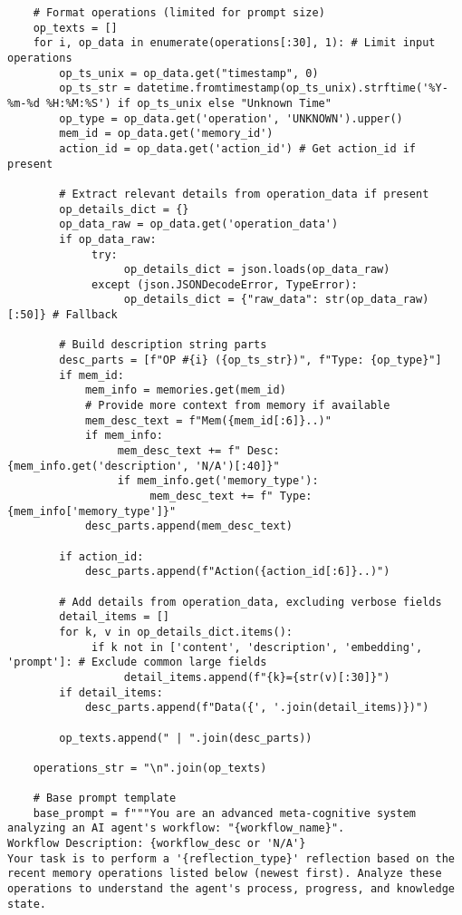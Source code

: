 \documentclass[12pt,a4paper]{article}
\begin{document}
\begin{pageablecode}
\begin{verbatim}
    # Format operations (limited for prompt size)
    op_texts = []
    for i, op_data in enumerate(operations[:30], 1): # Limit input operations
        op_ts_unix = op_data.get("timestamp", 0)
        op_ts_str = datetime.fromtimestamp(op_ts_unix).strftime('%Y-%m-%d %H:%M:%S') if op_ts_unix else "Unknown Time"
        op_type = op_data.get('operation', 'UNKNOWN').upper()
        mem_id = op_data.get('memory_id')
        action_id = op_data.get('action_id') # Get action_id if present

        # Extract relevant details from operation_data if present
        op_details_dict = {}
        op_data_raw = op_data.get('operation_data')
        if op_data_raw:
             try:
                  op_details_dict = json.loads(op_data_raw)
             except (json.JSONDecodeError, TypeError):
                  op_details_dict = {"raw_data": str(op_data_raw)[:50]} # Fallback

        # Build description string parts
        desc_parts = [f"OP #{i} ({op_ts_str})", f"Type: {op_type}"]
        if mem_id:
            mem_info = memories.get(mem_id)
            # Provide more context from memory if available
            mem_desc_text = f"Mem({mem_id[:6]}..)"
            if mem_info:
                 mem_desc_text += f" Desc: {mem_info.get('description', 'N/A')[:40]}"
                 if mem_info.get('memory_type'):
                      mem_desc_text += f" Type: {mem_info['memory_type']}"
            desc_parts.append(mem_desc_text)

        if action_id:
            desc_parts.append(f"Action({action_id[:6]}..)")

        # Add details from operation_data, excluding verbose fields
        detail_items = []
        for k, v in op_details_dict.items():
             if k not in ['content', 'description', 'embedding', 'prompt']: # Exclude common large fields
                  detail_items.append(f"{k}={str(v)[:30]}")
        if detail_items:
            desc_parts.append(f"Data({', '.join(detail_items)})")

        op_texts.append(" | ".join(desc_parts))

    operations_str = "\n".join(op_texts)

    # Base prompt template
    base_prompt = f"""You are an advanced meta-cognitive system analyzing an AI agent's workflow: "{workflow_name}".
Workflow Description: {workflow_desc or 'N/A'}
Your task is to perform a '{reflection_type}' reflection based on the recent memory operations listed below (newest first). Analyze these operations to understand the agent's process, progress, and knowledge state.


\end{verbatim}
\end{pageablecode}
\end{document}
